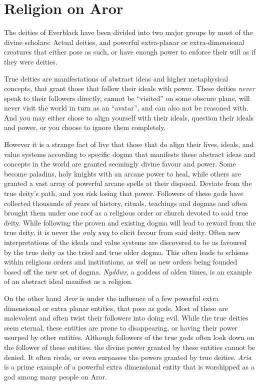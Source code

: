 \section{Religion on Aror}

The deities of Everblack have been divided into two major groups by most of
the divine scholars: Actual deities, and powerful extra-planar or
extra-dimensional creatures that either pose as such, or have enough power to
enforce their will as if they were deities.

True deities are manifestations of abstract ideas and higher metaphysical
concepts, that grant those that follow their ideals with power. These deities
\emph{never} speak to their followers directly, cannot be ``visited'' on some
obscure plane, will never visit the world in turn as an ``avatar'', and can
also not be reasoned with. And you may either chose to align yourself with
their ideals, question their ideals and power, or you choose to ignore them
completely.

However it is a strange fact of live that those that do align their lives,
ideals, and value systems according to specific dogma that manifests these
abstract ideas and concepts in the world are granted seemingly divine favour
and power. Some become paladins, holy knights with an arcane power to heal,
while others are granted a vast array of powerful arcane spells at their
disposal. Deviate from the true deity's path, and you risk losing that
power. Followers of these gods have collected thousands of years of history,
rituals, teachings and dogmas and often brought them under one roof as a
religious order or church devoted to said true deity. While following the
proven and existing dogma will lead to reward from the true deity, it is never
the \emph{only way} to elicit favour from said deity. Often new
interpretations of the ideals and value systems are discovered to be as
favoured by the true deity as the tried and true older dogma. This often leads
to schisms within religious orders and institutions, as well as new orders
being founded based off the new set of dogma. \emph{Nyddwr}, a goddess of
olden times, is an example of an abstract ideal manifest as a religion.

On the other hand \emph{Aror} is under the influence of a few powerful extra
dimensional or extra planar entities, that pose as gods. Most of these are
malevolent and often twist their followers into doing evil. While the true
deities seem eternal, these entities are prone to disappearing, or having
their power usurped by other entities. Although followers of the true gods
often look down on the follower of these entities, the divine power granted
by these entities cannot be denied. It often rivals, or even surpasses the
powers granted by true deities. \emph{Aria} is a prime example of a powerful
extra dimensional entity that is worshipped as a god among many people on
Aror.


